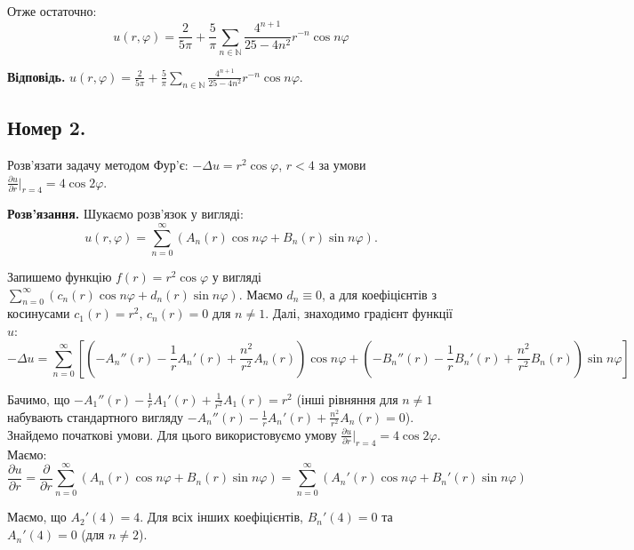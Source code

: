 \documentclass{hw_template}
\begin{document}
Отже остаточно:
\begin{equation*}
    u(r,\varphi) = \frac{2}{5\pi} + \frac{5}{\pi}\sum_{n \in \mathbb{N}}\frac{4^{n+1}}{25-4n^2}r^{-n}\cos n\varphi
\end{equation*}

\textbf{Відповідь.} $u(r,\varphi) = \frac{2}{5\pi} + \frac{5}{\pi}\sum_{n \in \mathbb{N}}\frac{4^{n+1}}{25-4n^2}r^{-n}\cos n\varphi$.

\newpage

\subsection{Номер 2.}

\begin{problem}
    Розв'язати задачу методом Фур'є: $-\Delta u = r^2\cos\varphi$, $r<4$ за умови $\frac{\partial u}{\partial r}\Big|_{r=4}=4\cos 2\varphi$.
\end{problem}

\textbf{Розв'язання.} Шукаємо розв'язок у вигляді:
\begin{equation*}
    u(r,\varphi) = \sum_{n=0}^{\infty}(A_n(r)\cos n\varphi + B_n(r)\sin n\varphi).
\end{equation*}

Запишемо функцію $f(r)=r^2\cos\varphi$ у вигляді $\sum_{n=0}^{\infty}(c_n(r)\cos
n\varphi + d_n(r)\sin n\varphi)$. Маємо $d_n \equiv 0$, а для коефіцієнтів з
косинусами $c_1(r)=r^2$, $c_n(r)=0$ для $n \neq 1$. Далі, знаходимо градієнт
функції $u$:
\begin{equation*}
    -\Delta u = \sum_{n=0}^{\infty}\left[\left(-A_n''(r)-\frac{1}{r}A_n'(r)+\frac{n^2}{r^2}A_n(r)\right)\cos n\varphi + \left(-B_n''(r)-\frac{1}{r}B_n'(r)+\frac{n^2}{r^2}B_n(r)\right)\sin n\varphi\right]
\end{equation*}

Бачимо, що $-A_1''(r)-\frac{1}{r}A_1'(r)+\frac{1}{r^2}A_1(r)=r^2$ (інші рівняння
для $n \neq 1$ набувають стандартного вигляду
$-A_n''(r)-\frac{1}{r}A_n'(r)+\frac{n^2}{r^2}A_n(r)=0$). Знайдемо початкові умови. 
Для цього використовуємо умову $\frac{\partial u}{\partial r}\Big|_{r=4}=4\cos 2\varphi$. Маємо:
\begin{equation*}
    \frac{\partial u}{\partial r} = \frac{\partial}{\partial r}\sum_{n=0}^{\infty}(A_n(r)\cos n\varphi + B_n(r)\sin n\varphi) = \sum_{n=0}^{\infty}(A_n'(r)\cos n\varphi + B_n'(r)\sin n\varphi)
\end{equation*}

Маємо, що $A_2'(4) = 4$. Для всіх інших коефіцієнтів, $B_n'(4)=0$ та $A_n'(4)=0$ (для $n \neq 2$).
\end{document}
